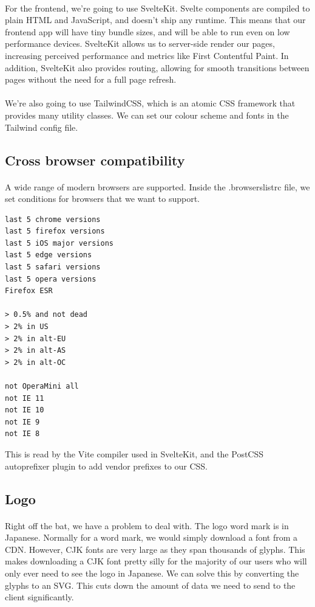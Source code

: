 \documentclass{report}
\begin{document}
\paragraph{}
For the frontend, we're going to use SvelteKit. Svelte components are compiled to plain HTML and JavaScript, and doesn't ship any runtime. This means that our frontend app will have tiny bundle sizes, and will be able to run even on low performance devices. SvelteKit allows us to server-side render our pages, increasing perceived performance and metrics like First Contentful Paint. In addition, SvelteKit also provides routing, allowing for smooth transitions between pages without the need for a full page refresh.

\paragraph{}
We're also going to use TailwindCSS, which is an atomic CSS framework that provides many utility classes. We can set our colour scheme and fonts in the Tailwind config file.

\subsection{Cross browser compatibility}
\paragraph{}
A wide range of modern browsers are supported. Inside the .browserslistrc file, we set conditions for browsers that we want to support.

\begin{verbatim}
last 5 chrome versions
last 5 firefox versions
last 5 iOS major versions
last 5 edge versions
last 5 safari versions
last 5 opera versions
Firefox ESR

> 0.5% and not dead
> 2% in US
> 2% in alt-EU
> 2% in alt-AS
> 2% in alt-OC

not OperaMini all
not IE 11
not IE 10
not IE 9
not IE 8
\end{verbatim}
This is read by the Vite compiler used in SvelteKit, and the PostCSS autoprefixer plugin to add vendor prefixes to our CSS.

\subsection{Logo}
\paragraph{}
Right off the bat, we have a problem to deal with. The logo word mark is in Japanese. Normally for a word mark, we would simply download a font from a CDN. However, CJK fonts are very large as they span thousands of glyphs. This makes downloading a CJK font pretty silly for the majority of our users who will only ever need to see the logo in Japanese. We can solve this by converting the glyphs to an SVG. This cuts down the amount of data we need to send to the client significantly.
\end{document}
